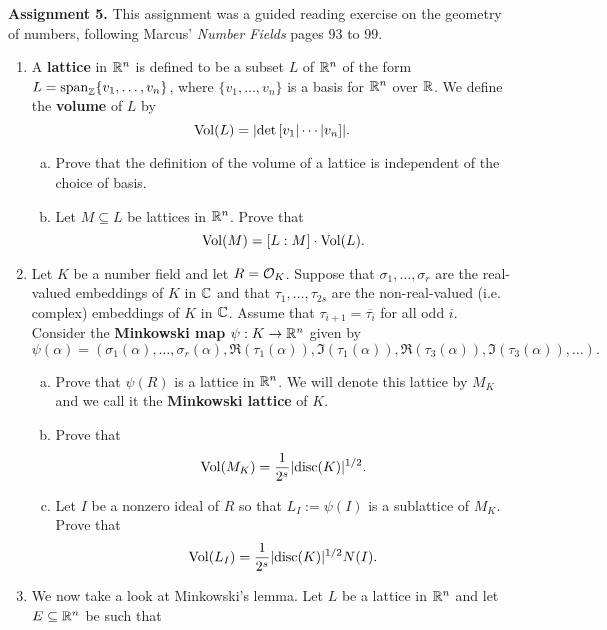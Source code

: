 {\bf Assignment 5.} This assignment was a guided reading exercise on the geometry 
of numbers, following Marcus' \emph{Number Fields} pages 93 to 99.
\begin{enumerate}[leftmargin=1.5cm, label={{\bf A5-\arabic*}}]
    \item \label{A5-1} A {\bf lattice} in $\mathbb{R}^n$ is defined to be a subset 
    $L$ of $\mathbb{R}^n$ of the form $L = \operatorname{span}_{\mathbb{Z}}\{v_1, \dots, v_n\}$, where 
    $\{v_1, \dots, v_n\}$ is a basis for $\mathbb{R}^n$ over $\mathbb{R}$. We define the 
    {\bf volume} of $L$ by 
    \[ \operatorname{Vol}(L) = \lvert\det\,[v_1|\cdots|v_n]\rvert. \] 
    \begin{enumerate}[(a)]
        \item Prove that the definition of the volume of a lattice is 
        independent of the choice of basis. 
        \item Let $M \subseteq L$ be lattices in $\mathbb{R}^n$. Prove that 
        \[ \operatorname{Vol}(M) = [L : M] \cdot \operatorname{Vol}(L). \] 
    \end{enumerate}
    \item \label{A5-2} Let $K$ be a number field and let $R = {\cal O}_K$. 
    Suppose that $\sigma_1, \dots, \sigma_r$ are the real-valued embeddings 
    of $K$ in $\mathbb{C}$ and that $\tau_1, \dots, \tau_{2s}$ are the non-real-valued 
    (i.e. complex) embeddings of $K$ in $\mathbb{C}$. Assume that $\tau_{i+1} = 
    \overline{\tau_i}$ for all odd $i$. Consider the {\bf Minkowski map} $\psi : 
    K \to \mathbb{R}^n$ given by 
    \[ \psi(\alpha) = (\sigma_1(\alpha), \dots, \sigma_r(\alpha), 
    \Re(\tau_1(\alpha)), \Im(\tau_1(\alpha)), \Re(\tau_3(\alpha)), 
    \Im(\tau_3(\alpha)), \dots). \]
    \begin{enumerate}[(a)]
        \item Prove that $\psi(R)$ is a lattice in $\mathbb{R}^n$. We will denote 
        this lattice by $M_K$ and we call it the {\bf Minkowski lattice} of $K$.
        \item Prove that 
        \[ \operatorname{Vol}(M_K) = \frac{1}{2^s} \lvert\operatorname{disc}(K)\rvert^{1/2}. \] 
        \item Let $I$ be a nonzero ideal of $R$ so that $L_I := \psi(I)$ 
        is a sublattice of $M_K$. Prove that 
        \[ \operatorname{Vol}(L_I) = \frac{1}{2^s} \lvert\operatorname{disc}(K)\rvert^{1/2} N(I). \] 
    \end{enumerate}
    \item \label{A5-3} We now take a look at Minkowski's lemma. Let 
    $L$ be a lattice in $\mathbb{R}^n$ and let $E \subseteq \mathbb{R}^n$ be such that 
    \begin{enumerate}[(1)]

\end{enumerate}
\end{enumerate}
